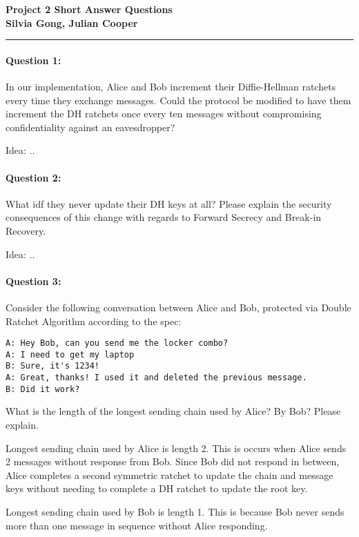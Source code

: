\documentclass[12pt,letterpaper,twoside]{article}
\begin{document}
{\centering \textbf{Project 2 Short Answer Questions\\ Silvia Gong, Julian Cooper\\}}
\vspace*{-8pt}\noindent\rule{\linewidth}{1pt}

\paragraph{Question 1: } In our implementation, Alice and Bob increment their
Diffie-Hellman ratchets every time they exchange messages. Could the protocol
be modified to have them increment the DH ratchets once every ten messages 
without compromising confidentiality against an eavesdropper?

{\color{purple}Idea: .. }


\paragraph{Question 2: } What idf they never update their DH keys at all?
Please explain the security consequences of this change with regards to
Forward Secrecy and Break-in Recovery.

{\color{purple}Idea: .. }


\paragraph{Question 3: } Consider the following conversation between Alice 
and Bob, protected via Double Ratchet Algorithm according to the spec:

\begin{verbatim}
A: Hey Bob, can you send me the locker combo?
A: I need to get my laptop
B: Sure, it's 1234!
A: Great, thanks! I used it and deleted the previous message.
B: Did it work?
\end{verbatim}

What is the length of the longest sending chain used by Alice? By Bob? 
Please explain.

{\color{purple} Longest sending chain used by Alice is length 2. This is 
occurs when Alice sends 2 messages without response from Bob. Since Bob 
did not respond in between, Alice completes a second symmetric ratchet 
to update the chain and message keys without needing to complete a DH 
ratchet to update the root key. }

{\color{purple} Longest sending chain used by Bob is length 1. This is 
because Bob never sends more than one message in sequence without Alice
responding. }
\end{document}
